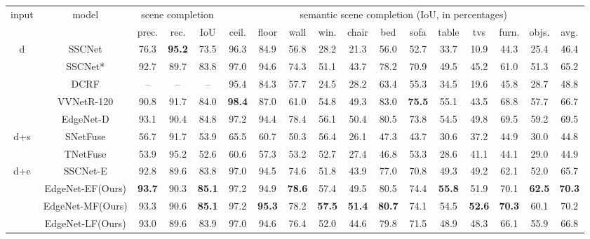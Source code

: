 \begin{table*}
  \centering
  \begin{tabular}
      { c | c | c c c | c c c c c c c c c c c c}
      \hline
     \multirow{ 2}{*}{input}&\multirow{ 2}{*}{model} & \multicolumn{3}{c|}{scene completion} & \multicolumn{12}{c}{semantic scene completion (IoU, in percentages)} \\
   
    & & prec. & rec. & IoU & ceil. & floor & wall & win. & chair & bed & sofa & table & tvs & furn. & objs. & avg. \\
    \hline
    \multirow{ 5}{*}{d}&SSCNet\cite{song_semantic_2017} & 76.3 & \textbf{95.2} & 73.5 & 96.3 & 84.9 & 56.8 & 28.2 & 21.3 & 56.0 & 52.7 & 33.7 & 10.9 & 44.3 & 25.4 & 46.4\\
&SSCNet*& 92.7&89.7&83.8&97.0&94.6&74.3&51.1&43.7&78.2&70.9&49.5&45.2&61.0&51.3&65.2\\


&DCRF \cite{zhang_semantic_2018}& – & – & –& 95.4 &  84.3 &  57.7 & 24.5 &  28.2 &  63.4 & 55.3 &  34.5 &  19.6 &  45.8 &  28.7 & 48.8 \\
  &VVNetR-120 \cite{guo_view-volume_2018}& 90.8 & 91.7 & 84.0 & \textbf{98.4} &  87.0 &  61.0 & 54.8 &  49.3 &  83.0 & \textbf{75.5} &  55.1 &  43.5 &  68.8 &  57.7 & 66.7 \\
  &EdgeNet-D & 93.1&90.4&84.8&97.2&94.4&78.4&56.1&50.4&80.5&73.8&54.5&49.8&69.5&59.2&69.5\\
    \hline
    \multirow{ 2}{*}{d+s}&SNetFuse\cite{See_and_think_2018} & 56.7 & 91.7 & 53.9 & 65.5 & 60.7 & 50.3 & 56.4 & 26.1 & 47.3 & 43.7 & 30.6 & 37.2 & 44.9 & 30.0 & 44.8\\
&TNetFuse\cite{See_and_think_2018} & 53.9 & 95.2 &52.6 &60.6&57.3&53.2&52.7&27.4&46.8&53.3&28.6 &41.1&44.1 &29.0& 44.9\\


\hline
      
   \multirow{4}{*}{d+e}
&SSCNet-E & 92.8&89.6&83.8&97.0&94.5&74.6&51.8&43.9&77.0&70.8&49.3&49.2&62.1&52.0&65.7\\
&EdgeNet-EF(Ours) &\textbf{93.7}&90.3&\textbf{85.1}&97.2&94.9&\textbf{78.6}&57.4&49.5&80.5&74.4&\textbf{55.8}&51.9&70.1&\textbf{62.5}&\textbf{70.3}\\
&EdgeNet-MF(Ours) & 93.3 & 90.6 & \textbf{85.1} & 97.2 & \textbf{95.3} & 78.2 & \textbf{57.5} & \textbf{51.4} & \textbf{80.7} & 74.1 & 54.5 & \textbf{52.6} & \textbf{70.3} & 60.1 & 70.2\\
&EdgeNet-LF(Ours) & 93.0 & 89.6 & 83.9 & 97.0 & 94.6 & 76.4 & 52.0 & 44.6 & 79.8 & 71.5 & 48.9 & 48.3 & 66.1 & 55.9 & 66.8\\
 \hline
    

\end{tabular}
\end{table*}
